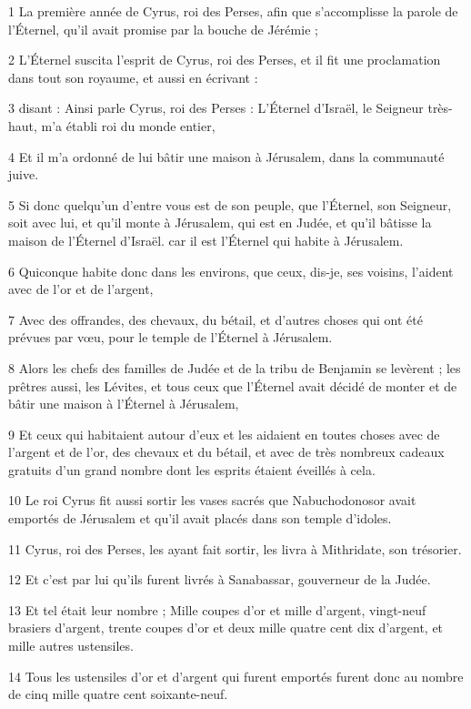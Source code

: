 \par 1 La première année de Cyrus, roi des Perses, afin que s'accomplisse la parole de l'Éternel, qu'il avait promise par la bouche de Jérémie ;
\par 2 L'Éternel suscita l'esprit de Cyrus, roi des Perses, et il fit une proclamation dans tout son royaume, et aussi en écrivant :
\par 3 disant : Ainsi parle Cyrus, roi des Perses : L'Éternel d'Israël, le Seigneur très-haut, m'a établi roi du monde entier,
\par 4 Et il m'a ordonné de lui bâtir une maison à Jérusalem, dans la communauté juive.
\par 5 Si donc quelqu'un d'entre vous est de son peuple, que l'Éternel, son Seigneur, soit avec lui, et qu'il monte à Jérusalem, qui est en Judée, et qu'il bâtisse la maison de l'Éternel d'Israël. car il est l'Éternel qui habite à Jérusalem.
\par 6 Quiconque habite donc dans les environs, que ceux, dis-je, ses voisins, l'aident avec de l'or et de l'argent,
\par 7 Avec des offrandes, des chevaux, du bétail, et d'autres choses qui ont été prévues par vœu, pour le temple de l'Éternel à Jérusalem.
\par 8 Alors les chefs des familles de Judée et de la tribu de Benjamin se levèrent ; les prêtres aussi, les Lévites, et tous ceux que l'Éternel avait décidé de monter et de bâtir une maison à l'Éternel à Jérusalem,
\par 9 Et ceux qui habitaient autour d'eux et les aidaient en toutes choses avec de l'argent et de l'or, des chevaux et du bétail, et avec de très nombreux cadeaux gratuits d'un grand nombre dont les esprits étaient éveillés à cela.
\par 10 Le roi Cyrus fit aussi sortir les vases sacrés que Nabuchodonosor avait emportés de Jérusalem et qu'il avait placés dans son temple d'idoles.
\par 11 Cyrus, roi des Perses, les ayant fait sortir, les livra à Mithridate, son trésorier.
\par 12 Et c'est par lui qu'ils furent livrés à Sanabassar, gouverneur de la Judée.
\par 13 Et tel était leur nombre ; Mille coupes d'or et mille d'argent, vingt-neuf brasiers d'argent, trente coupes d'or et deux mille quatre cent dix d'argent, et mille autres ustensiles.
\par 14 Tous les ustensiles d'or et d'argent qui furent emportés furent donc au nombre de cinq mille quatre cent soixante-neuf.
